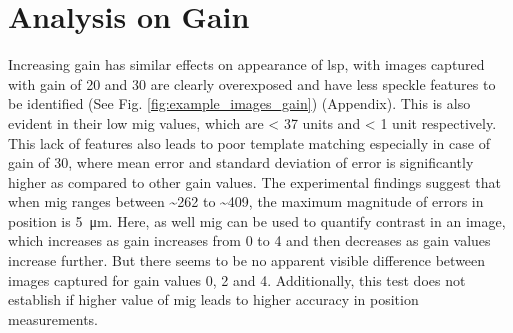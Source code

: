 


\section{Analysis on Gain}
    Increasing gain has similar effects on appearance of \gls{lsp}, with images captured with gain of 20 and 30 are clearly overexposed and have less speckle features to be identified (See Fig. \ref{fig:example_images_gain}) (Appendix). This is also evident in their low \gls{mig} values, which are < 37 units and < 1 unit respectively. This lack of features also leads to poor template matching especially in case of gain of 30, where mean error and standard deviation of error is significantly higher as compared to other gain values. The experimental findings suggest that when \gls{mig} ranges between \sim262 to \sim409, the maximum magnitude of errors in position is \SI{5}{\micro\meter}. Here, as well \gls{mig} can be used to quantify contrast in an image, which increases as gain increases from 0 to 4 and then decreases as gain values increase further. But there seems to be no apparent visible difference between images captured for gain values 0, 2 and 4. Additionally, this test does not establish if higher value of \gls{mig} leads to higher accuracy in position measurements.


